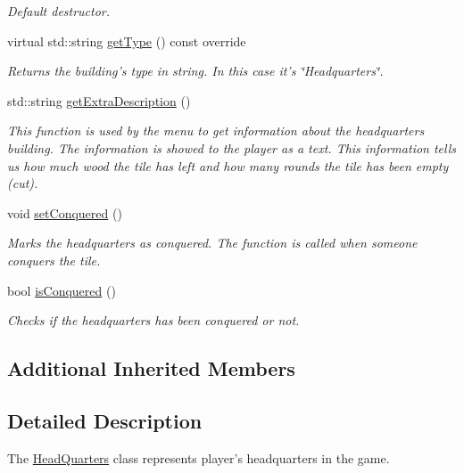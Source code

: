 \begin{DoxyCompactItemize}
\begin{DoxyCompactList}\small\item\em Default destructor. \end{DoxyCompactList}\item 
virtual std\-::string \hyperlink{class_course_1_1_head_quarters_a1d9a996a6a87ca31aeb63dff2d41d242}{get\-Type} () const override
\begin{DoxyCompactList}\small\item\em Returns the building's type in string. In this case it's \char`\"{}\-Headquarters\char`\"{}. \end{DoxyCompactList}\item 
std\-::string \hyperlink{class_course_1_1_head_quarters_ab455c3d5e70105ce23ff7c867186b92d}{get\-Extra\-Description} ()
\begin{DoxyCompactList}\small\item\em This function is used by the menu to get information about the headquarters building. The information is showed to the player as a text. This information tells us how much wood the tile has left and how many rounds the tile has been empty (cut). \end{DoxyCompactList}\item 
void \hyperlink{class_course_1_1_head_quarters_af5eb2e424dd347944d8269caf4895024}{set\-Conquered} ()
\begin{DoxyCompactList}\small\item\em Marks the headquarters as conquered. The function is called when someone conquers the tile. \end{DoxyCompactList}\item 
bool \hyperlink{class_course_1_1_head_quarters_aea58a7b64a367ab77683756193401956}{is\-Conquered} ()
\begin{DoxyCompactList}\small\item\em Checks if the headquarters has been conquered or not. \end{DoxyCompactList}\end{DoxyCompactItemize}
\subsection*{Additional Inherited Members}


\subsection{Detailed Description}
The \hyperlink{class_course_1_1_head_quarters}{Head\-Quarters} class represents player's headquarters in the game. 

